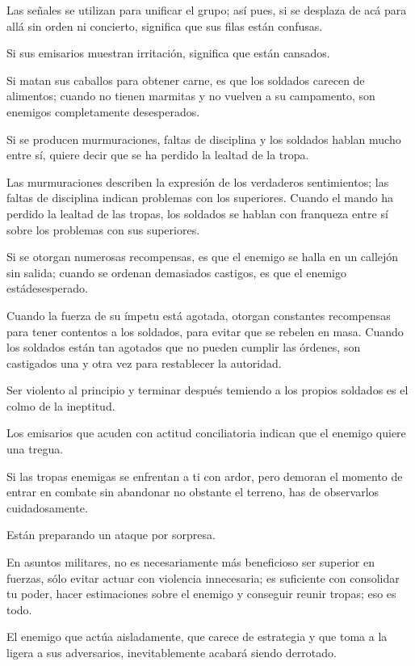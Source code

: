 Las señales se utilizan para unificar el grupo; así pues, si se desplaza de acá para allá sin orden ni concierto, significa que sus filas están confusas.

Si sus emisarios muestran irritación, significa que están cansados.

Si matan sus caballos para obtener carne, es que los soldados carecen de alimentos; cuando no tienen marmitas y no vuelven a su campamento, son enemigos completamente desesperados.

Si se producen murmuraciones, faltas de disciplina y los soldados hablan mucho entre sí, quiere decir que se ha perdido la lealtad de la tropa.

Las murmuraciones describen la expresión de los verdaderos sentimientos; las faltas de disciplina indican problemas con los superiores. Cuando el mando ha perdido la lealtad de las tropas, los soldados se hablan con franqueza entre sí sobre los problemas con sus superiores.

Si se otorgan numerosas recompensas, es que el enemigo se halla en un callejón sin salida; cuando se ordenan demasiados castigos, es que el enemigo estádesesperado.

Cuando la fuerza de su ímpetu está agotada, otorgan constantes recompensas para tener contentos a los soldados, para evitar que se rebelen en masa. Cuando los soldados están tan agotados que no pueden cumplir las órdenes, son castigados una y otra vez para restablecer la autoridad.

Ser violento al principio y terminar después temiendo a los propios soldados es el colmo de la ineptitud.

Los emisarios que acuden con actitud conciliatoria indican que el enemigo quiere una tregua.

Si las tropas enemigas se enfrentan a ti con ardor, pero demoran el momento de entrar en combate sin abandonar no obstante el terreno, has de observarlos cuidadosamente.

Están preparando un ataque por sorpresa.

En asuntos militares, no es necesariamente más beneficioso ser superior en fuerzas, sólo evitar actuar con violencia innecesaria; es suficiente con consolidar tu poder, hacer estimaciones sobre el enemigo y conseguir reunir tropas; eso es todo.

El enemigo que actúa aisladamente, que carece de estrategia y que toma a la ligera a sus adversarios, inevitablemente acabará siendo derrotado.

